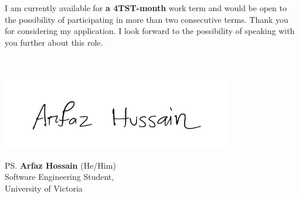 \documentclass[a4paper, 12pt, oneside]{letter}
\newcommand{\Terms}{a 4TST-month}
\begin{document}
I am currently available for \textbf{\Terms} work term and would be open to the possibility of participating in more than two consecutive terms. Thank you for considering my application. I look forward to the possibility of speaking with you further about this role. \\\\\\
\vspace{10pt}
\vspace{-25pt}\begin{flushleft}
\hspace*{-1cm}\includegraphics[width=10cm]{../../9.2 PreProcessed/0 Resources/signature.png}\vspace{-1cm}
\end{flushleft}
\vspace{-10pt}\ps{\textbf{Arfaz Hossain} (He/Him)\\
Software Engineering Student,\\
University of Victoria} 
\end{document}

